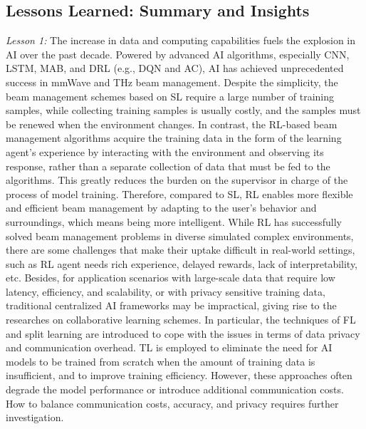 \documentclass[journal,comsoc]{IEEEtran}
\begin{document}
\subsection{Lessons Learned: Summary and Insights}
\emph{Lesson 1:} The increase in data and computing capabilities fuels the explosion in AI over the past decade. Powered by advanced AI algorithms, especially CNN, LSTM, MAB, and DRL (e.g., DQN and AC), AI has achieved unprecedented success in mmWave and THz beam management. Despite the simplicity, the beam management schemes based on SL require a large number of training samples, while collecting training samples is usually costly, and the samples must be renewed when the environment changes. In contrast, the RL-based beam management algorithms acquire the training data in the form of the learning agent's experience by interacting with the environment and observing its response, rather than a separate collection of data that must be fed to the algorithms. This greatly reduces the burden on the supervisor in charge of the process of model training. Therefore, compared to SL, RL enables more flexible and efficient beam management by adapting to the user's behavior and surroundings, which means being more intelligent. While RL has successfully solved beam management problems in diverse simulated complex environments, there are some challenges that make their uptake difficult in real-world settings, such as RL agent needs rich experience, delayed rewards, lack of interpretability, etc. Besides, for application scenarios with large-scale data that require low latency, efficiency, and scalability, or with privacy sensitive training data, traditional centralized AI frameworks may be impractical, giving rise to the researches on collaborative learning schemes. In particular, the techniques of FL and split learning are introduced to cope with the issues in terms of data privacy and communication overhead. TL is employed to eliminate the need for AI models to be trained from scratch when the amount of training data is insufficient, and to improve training efficiency. However, these approaches often degrade the model performance or introduce additional communication costs. How to balance communication costs, accuracy, and privacy requires further investigation.
\end{document}
